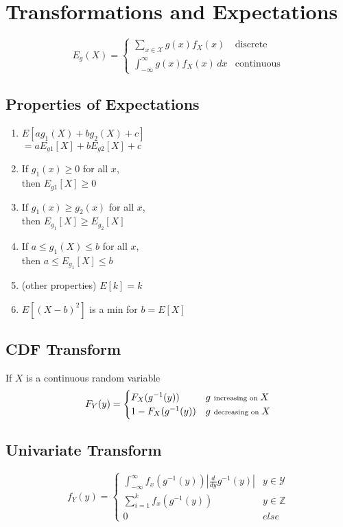 \section{Transformations and Expectations}
	\begin{equation*}
		E_g(X) = 
		\begin{cases}
			\sum_{x\in\mathcal X} g(x)f_X(x) & \text{discrete} \\
			\int_{-\infty}^{\infty} g(x)f_X(x) \,dx & \text{continuous}
		\end{cases}
	\end{equation*}
	
	\subsection*{Properties of Expectations}
		\begin{enumerate}
			\item \(E[ag_1(X) +bg_2(X) + c] \)\\ \(= aE_{g1}[X] + bE_{g2}[X] + c \)
			\item If \(g_1(x)\geq0\) for all \(x\), \\ then \(E_{g1}[X]\geq0\)
			\item If \(g_1(x) \geq g_2(x)\) for all \(x\), \\ then \(E_{g_1}[X] \geq E_{g_2}[X]\)
			\item If \(a \leq g_1(X) \leq b\) for all \(x\), \\ then \(a \leq E_{g_1}[X] \leq b\)
			\item (other properties) \(E[k] = k\)
			\item \(E[(X-b)^2]\) is a min for \(b=E[X]\)
		\end{enumerate}
		
	\subsection{CDF Transform}
		If \(X\) is a continuous random variable
		\begin{equation*}
			F_Y(y) = \begin{cases}
				F_X(g^{-1}(y)) & g\ \text{\scriptsize increasing on }X \\
				1- F_X(g^{-1}(y)) & g\ \text{\scriptsize decreasing on }X
			\end{cases}
		\end{equation*}
		
	\subsection{Univariate Transform}
		\begin{equation*}
			f_Y(y) = \begin{cases}
				\int_{-\infty}^{\infty} f_x(g^{-1}(y))|\frac{d}{dy}g^{-1}(y)| & y \in \mathcal{Y} \\
				\sum_{i=1}^{k} f_x(g^{-1}(y)) & y \in \mathbb{Z}\\
				0 & else
			\end{cases}
		\end{equation*}
	
